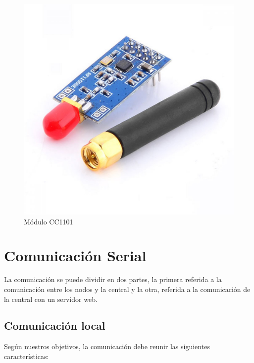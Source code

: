 \begin{figure}[htb]
	\centering
	\includegraphics[scale=0.2]{images/modulo_cc1101.jpg}
    \caption{Módulo CC1101}
	\label{fig:module_cc1101}
\end{figure}

\section{Comunicación Serial}

La comunicación se puede dividir en dos partes, la primera referida a la comunicación entre los nodos y la central y la otra, referida a la comunicación
de la central con un servidor web.


\subsection{Comunicación local}

Según nuestros objetivos, la comunicación debe reunir las siguientes características:

